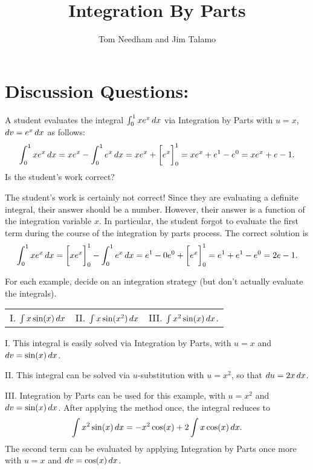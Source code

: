 \documentclass[]{ximera}
\title{Integration By Parts}
\begin{document}
\begin{abstract}		\end{abstract}
\author{Tom Needham and Jim Talamo}

\maketitle




\section{Discussion Questions:}


\begin{problem}
A student evaluates the integral $\int_0^1 x e^x \mathop{}\!d x$ via Integration by Parts with $u=x$, $\mathop{}\!d v = e^x \mathop{}\!d x$ as follows:
\[
\int_0^1 x e^x \mathop{}\!d x = x e^x - \int_0^1 e^x \mathop{}\!d x = x e^x + \bigg[ e^x \bigg]_0^1 = x e^x + e^1 - e^0 = xe^x + e -1.
\]
Is the student's work correct?
\end{problem}

\begin{freeResponse}
The student's work is certainly not correct! Since they are evaluating a definite integral, their answer should be a number. However, their answer is a function of the integration variable $x$. In particular, the student forgot to evaluate the first term during the course of the integration by parts process. The correct solution is 
$$
\int_0^1 x e^x \mathop{}\!d x = \bigg[ x e^x \bigg]_0^1 - \int_0^1 e^x \mathop{}\!d x = e^1 - 0e^0 + \bigg[ e^x \bigg]_0^1 = e^1 + e^1 - e^0 = 2e -1.
$$
\end{freeResponse}

\begin{problem}
For each example, decide on an integration strategy (but don't actually evaluate the integrals).

\begin{center}
\begin{tabular}{lll}
I. $\int x \sin (x) \mathop{}\!d x$ \hspace{0.2in} & II. $\int x \sin (x^2) \mathop{}\!d x$  \hspace{0.2in} & III. $\int x^2 \sin (x) \mathop{}\!d x$.
\end{tabular}
\end{center}
\end{problem}

\begin{freeResponse}
I. This integral is easily solved via Integration by Parts, with $u=x$ and $\mathop{}\!d v = \sin(x) \mathop{}\!d x$.

II. This integral can be solved via $u$-substitution with $u = x^2$, so that $\mathop{}\!d u = 2 x \mathop{}\!d x$.

III. Integration by Parts can be used for this example, with $u=x^2$ and $\mathop{}\!d v = \sin(x) \mathop{}\!d x$. After applying the method once, the integral reduces to 
$$
\int x^2 \sin (x) \mathop{}\!d x = -x^2\cos(x) + 2\int x \cos(x) \mathop{}\!d x.
$$
The second term can be evaluated by applying Integration by Parts once more with $u = x$ and $\mathop{}\!d v = \cos (x) \mathop{}\!d x$. 
\end{freeResponse}
\end{document}
